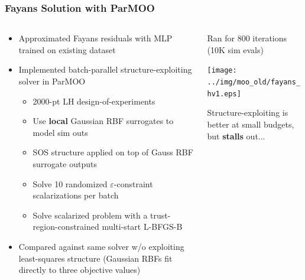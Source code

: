\documentclass[aspectratio=169]{beamer}
\begin{document}
\begin{frame}\frametitle{Fayans Solution with ParMOO}
\begin{columns}
\begin{column}{0.55\textwidth}
\begin{itemize}
\item Approximated Fayans residuals with MLP trained on existing dataset
\item Implemented batch-parallel
{\color{blue} structure-exploiting solver in ParMOO}
\begin{itemize}
\item 2000-pt LH design-of-experiments
\item Use {\bf local} Gaussian RBF surrogates to model sim outs
\item SOS structure applied on top of Gauss RBF surrogate outputs
\item Solve 10 randomized $\varepsilon$-constraint scalarizations per batch
\item Solve scalarized problem with a trust-region-constrained
multi-start L-BFGS-B
\end{itemize}
\item Compared against
{\color{red} same solver w/o exploiting least-squares structure}
(Gaussian RBFs fit directly to three objective values)
\end{itemize}
\end{column}
\begin{column}{0.45\textwidth}
Ran for 800 iterations (10K sim evals)\\

\bigskip

\texttt{[image: ../img/moo\_old/fayans\_hv1.eps]}\\

\bigskip

Structure-exploiting is better at small budgets, but {\bf stalls} out...
\end{column}
\end{columns}
\end{frame}
\end{document}
